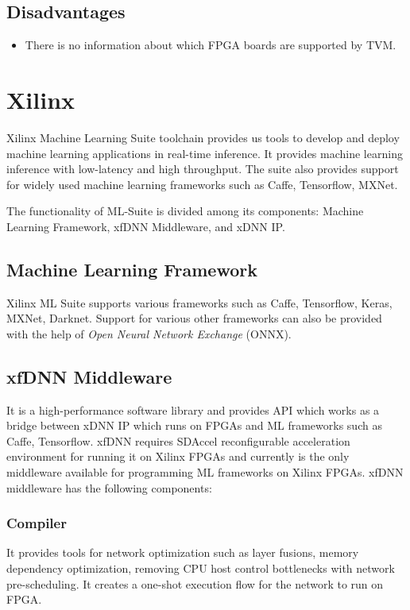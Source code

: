 \documentclass[titlepage]{report}
\begin{document}
 \subsection{Disadvantages}
 \begin{itemize}
 \item There is no information about which FPGA boards are supported by TVM.
 \end{itemize}
\pagebreak
\section{Xilinx}
Xilinx Machine Learning Suite toolchain provides us tools to develop and deploy machine learning applications in real-time inference. It provides machine learning inference with low-latency and high throughput. The suite also provides support for widely used machine learning frameworks such as Caffe, Tensorflow, MXNet.

The functionality of ML-Suite is divided among its components: Machine Learning Framework, xfDNN Middleware, and xDNN IP.

\subsection{Machine Learning Framework}
Xilinx ML Suite supports various frameworks such as Caffe, Tensorflow, Keras, MXNet, Darknet. Support for various other frameworks can also be provided with the help of \textit{Open Neural Network Exchange} (ONNX).

\subsection{xfDNN Middleware}
It is a high-performance software library and provides API which works as a bridge between xDNN IP which runs on FPGAs and ML frameworks such as Caffe, Tensorflow. xfDNN requires SDAccel reconfigurable acceleration environment for running it on Xilinx FPGAs and currently is the only middleware available for programming ML frameworks on Xilinx FPGAs. xfDNN middleware has the following components:
\subsubsection{Compiler}

It provides tools for network optimization such as layer fusions, memory dependency optimization, removing CPU host control bottlenecks with network pre-scheduling. It creates a one-shot execution flow for the network to run on FPGA.
\end{document}

